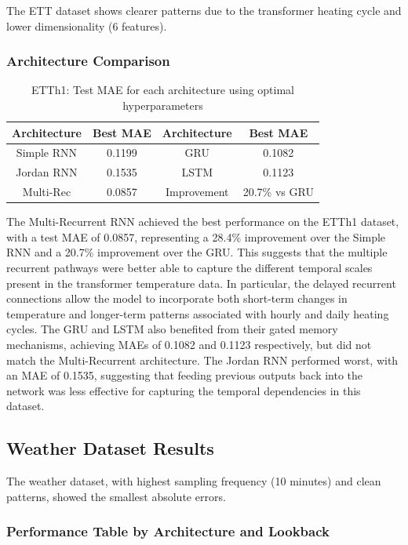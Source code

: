 \documentclass[conference]{IEEEtran}
\begin{document}
The ETT dataset shows clearer patterns due to the transformer
heating cycle and lower dimensionality (6 features).

\subsubsection{Architecture Comparison}

\begin{table}[H]
\centering
\caption{ETTh1: Test MAE for each architecture using optimal
hyperparameters}
\label{tab:etth1_architecture}
\begin{tabular}{cc|cc}
\toprule
\textbf{Architecture} & \textbf{Best MAE} & \textbf{Architecture} & \textbf{Best MAE} \\
\midrule
Simple RNN & 0.1199 & GRU & 0.1082 \\
Jordan RNN & 0.1535 & LSTM & 0.1123 \\
Multi-Rec & 0.0857 & Improvement & 20.7\% vs GRU \\
\bottomrule
\end{tabular}
\end{table}

The Multi-Recurrent RNN achieved the best performance on the ETTh1 dataset,
with a test MAE of 0.0857, representing a 28.4\% improvement over the Simple RNN
and a 20.7\% improvement over the GRU. This suggests that the multiple recurrent
pathways were better able to capture the different temporal scales present in the
transformer temperature data. In particular, the delayed recurrent connections
allow the model to incorporate both short-term changes in temperature and longer-term
patterns associated with hourly and daily heating cycles. The GRU and LSTM also
benefited from their gated memory mechanisms, achieving MAEs of 0.1082 and 0.1123
respectively, but did not match the Multi-Recurrent architecture. The Jordan RNN
performed worst, with an MAE of 0.1535, suggesting that feeding previous outputs back
into the network was less effective for capturing the temporal dependencies in this
dataset.

\subsection{Weather Dataset Results}

The weather dataset, with highest sampling frequency (10 minutes) 
and clean patterns, showed the smallest absolute errors.

\subsubsection{Performance Table by Architecture and Lookback}
\end{document}
